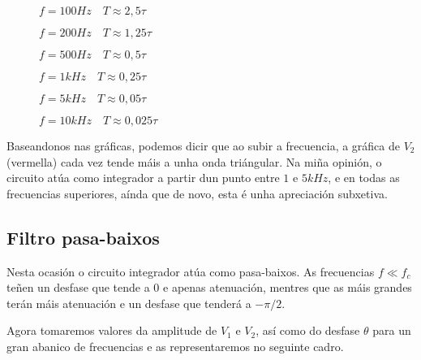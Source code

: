 \documentclass[12pt, a4paper, titlepage]{article}
\begin{document}
    \begin{figure}[H]
      \centering
      \begin{minipage}{5.2cm}
        $f = 100Hz \quad T \approx 2,5 \tau$

        \resizebox{8.1cm}{!}{}

        $f = 200Hz \quad T \approx 1,25 \tau$

        \resizebox{8.1cm}{!}{}
      \end{minipage}
      \begin{minipage}{5.2cm}
        $f = 500Hz \quad T \approx 0,5 \tau$

        \resizebox{5.2cm}{!}{}

        $f = 1kHz \quad T \approx 0,25 \tau$

        \resizebox{8.1cm}{!}{}
      \end{minipage}
      \begin{minipage}{5.2cm}
        $f = 5kHz \quad T \approx 0,05 \tau$

        \resizebox{39cm}{!}{}

        $f = 10kHz \quad T \approx 0,025 \tau$

        \resizebox{78cm}{!}{}
      \end{minipage}
    \end{figure}

    Baseandonos nas gráficas, podemos dicir que ao subir a frecuencia, a gráfica de $V_2$ (vermella) cada vez tende máis a unha onda triángular.
    Na miña opinión, o circuito atúa como integrador a partir dun punto entre $1$ e $5 kHz$, e en todas as frecuencias superiores, aínda que de novo, esta é unha apreciación subxetiva.

    \subsection{Filtro pasa-baixos}

    Nesta ocasión o circuito integrador atúa como pasa-baixos. As frecuencias $f \ll f_c$ teñen un desfase que tende a 0 e apenas atenuación, mentres que as máis grandes terán máis atenuación e un desfase que tenderá a $-\pi / 2$.
   
    Agora tomaremos valores da amplitude de $V_1$ e $V_2$, así como do desfase $\theta$ para un gran abanico de frecuencias e as representaremos no seguinte cadro.
    
\end{document}
